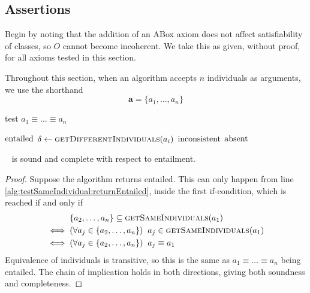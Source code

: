 \documentclass[paper.tex]{subfiles}
\begin{document}
\subsection{Assertions}
\label{sec:algorithms:assert}

Begin by noting that the addition of an ABox axiom does not affect satisfiability of classes, so $O$ cannot become incoherent.  We take this as given, without proof, for all axioms tested in this section.

Throughout this section, when an algorithm accepts $n$ individuals as arguments, we use the shorthand
\[\mathbf{a} = \{a_1, \ldots, a_n\}\]

\todo[notation]

\begin{algorithm}[H]
  \caption{test $a_1 \equiv \ldots \equiv a_n$}
  \begin{algorithmic}[1]
    \raggedright
        \State \Return $\mathrm{entailed}$
        \label{alg:testSameIndividual:returnEntailed}
      \Else
          \State $\delta \gets \Call{getDifferentIndividuals}{a_i}$
            \State \Return $\mathrm{inconsistent}$
            \label{alg:testSameIndividual:returnInconsistent}
          \EndIf
        \EndFor
        \State \Return $\mathrm{absent}$
      \EndIf
    \EndFunction
  \end{algorithmic}
\end{algorithm}

\begin{proposition}
  \label{prop:testSameIndividualEntailed}
  \sloppy~
   is sound and complete with respect to entailment.
\end{proposition}
\begin{proof}
  Suppose the algorithm returns entailed.  This can only happen from line \ref{alg:testSameIndividual:returnEntailed}, inside the first if-condition, which is reached if and only if
  \begin{align*}
    & \{a_2, \ldots, a_n\} \subseteq \Call{getSameIndividuals}{a_1} \\
    \iff{}&(\forall a_j \in \{a_2, \ldots, a_n\}) \;\; a_j \in \Call{getSameIndividuals}{a_1} \\
    \iff{}& (\forall a_j \in \{a_2, \ldots, a_n\}) \;\; a_j \equiv a_1
  \end{align*}
  Equivalence of individuals is transitive, so this is the same as $a_1 \equiv \ldots \equiv a_n$ being entailed.  The chain of implication holds in both directions, giving both soundness and completeness.
\end{proof}
\end{document}
